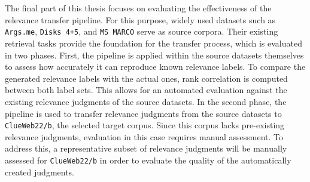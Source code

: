 \\\\
The final part of this thesis focuses on evaluating the effectiveness of the relevance transfer pipeline. For this purpose, widely used datasets such as \texttt{Args.me}, \texttt{Disks 4+5}, and \texttt{MS MARCO} serve as source corpora. Their existing retrieval tasks provide the foundation for the transfer process, which is evaluated in two phases. First, the pipeline is applied within the source datasets themselves to assess how accurately it can reproduce known relevance labels. To compare the generated relevance labels with the actual ones, rank correlation is computed between both label sets. This allows for an automated evaluation against the existing relevance judgments of the source datasets. In the second phase, the pipeline is used to transfer relevance judgments from the source datasets to \texttt{ClueWeb22/b}, the selected target corpus. Since this corpus lacks pre-existing relevance judgments, evaluation in this case requires manual assessment. To address this, a representative subset of relevance judgments will be manually assessed for \texttt{ClueWeb22/b} in order to evaluate the quality of the automatically created judgments.
